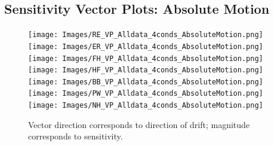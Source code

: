 \documentclass[11pt]{article} %
\begin{document}
\subsection{Sensitivity Vector Plots: Absolute Motion}
\begin{figure}[H]
\centering %
\texttt{[image: Images/RE\_VP\_Alldata\_4conds\_AbsoluteMotion.png]}
\texttt{[image: Images/ER\_VP\_Alldata\_4conds\_AbsoluteMotion.png]}
\texttt{[image: Images/FH\_VP\_Alldata\_4conds\_AbsoluteMotion.png]}
\texttt{[image: Images/HF\_VP\_Alldata\_4conds\_AbsoluteMotion.png]}
\texttt{[image: Images/BB\_VP\_Alldata\_4conds\_AbsoluteMotion.png]}
\texttt{[image: Images/PW\_VP\_Alldata\_4conds\_AbsoluteMotion.png]}
\texttt{[image: Images/NH\_VP\_Alldata\_4conds\_AbsoluteMotion.png]}
\caption{Vector direction corresponds to direction of drift; magnitude corresponds to sensitivity.}
\end{figure}
\end{document}
